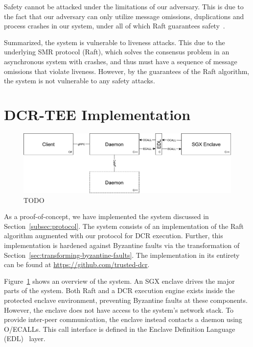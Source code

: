 \documentclass{article}
\begin{document}
		Safety cannot be attacked under the limitations of our adversary.
        This is due to the fact that our adversary can only utilize message omissions, duplications and process crashes in our system, under all of which Raft guarantees safety~\cite{ongaro_search_2014}.

        Summarized, the system is vulnerable to liveness attacks.
        This due to the underlying SMR protocol (Raft), which solves the consensus problem in an asynchronous system with crashes, and thus must have a sequence of message omissions that violate liveness.
        However, by the guarantees of the Raft algorithm, the system is not vulnerable to any safety attacks.

	\section{DCR-TEE Implementation}
	\begin{figure}[t]
		\centering
		\includegraphics[width=\textwidth]{figures/dcr-graphs/network-stack.pdf}
		\caption{TODO}
		\label{fig:network-stack}
	\end{figure}

	As a proof-of-concept, we have implemented the system discussed in Section~\ref{subsec:protocol}.
	The system consists of an implementation of the Raft~\cite{ongaro_search_2014} algorithm augmented with our protocol for DCR execution.
	Further, this implementation is hardened against Byzantine faults via the transformation of Section~\ref{sec:transforming-byzantine-faults}.
	The implementation in its entirety can be found at \url{https://github.com/trusted-dcr}.

	Figure~\ref{fig:network-stack} shows an overview of the system.
	An SGX enclave drives the major parts of the system.
	Both Raft and a DCR execution engine exists inside the protected enclave environment, preventing Byzantine faults at these components.
	However, the enclave does not have access to the system's network stack.
	To provide inter-peer communication, the enclave instead contacts a daemon using O/ECALLs.
	This call interface is defined in the Enclave Definition Language (EDL)~\cite{intel_sgx_guide} layer.
\end{document}
